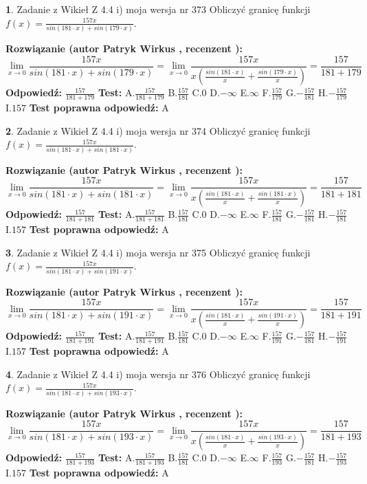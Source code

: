 \documentclass[12pt, a4paper]{article}
\theoremstyle{definition} %
\newtheorem{zad}{}
\newcommand{\zadStart}[1]{\begin{zad}#1\newline}
\newcommand{\zadStop}{\end{zad}}
\newcommand{\rozwStart}[2]{\noindent \textbf{Rozwiązanie (autor #1 , recenzent #2): }\newline}
\newcommand{\rozwStop}{\newline}
\newcommand{\odpStart}{\noindent \textbf{Odpowiedź:}\newline}
\newcommand{\odpStop}{\newline}
\newcommand{\testStart}{\noindent \textbf{Test:}\newline}
\newcommand{\testStop}{\newline}
\newcommand{\kluczStart}{\noindent \textbf{Test poprawna odpowiedź:}\newline}
\newcommand{\kluczStop}{\newline}
\begin{document}
\zadStart{Zadanie z Wikieł Z 4.4 i) moja wersja nr 373}
Obliczyć granicę funkcji $f(x)=\frac{157x}{sin(181\cdot x) +sin(179\cdot x)}$.
\zadStop
\rozwStart{Patryk Wirkus}{}
$$\lim\limits_{x\to 0}\frac{157x}{sin(181\cdot x) +sin(179\cdot x)}=\lim\limits_{x\to 0}\frac{157x}{x(\frac{sin(181\cdot x)}{x}+\frac{sin(179\cdot x)}{x})}=\frac{157}{181+179}$$
\rozwStop
\odpStart
$\frac{157}{181+179}$
\odpStop
\testStart
A.$\frac{157}{181+179}$
B.$\frac{157}{181}$
C.$0$
D.$-\infty$
E.$\infty$
F.$\frac{157}{179}$
G.$-\frac{157}{181}$
H.$-\frac{157}{179}$
I.$157$
\testStop
\kluczStart
A
\kluczStop



\zadStart{Zadanie z Wikieł Z 4.4 i) moja wersja nr 374}
Obliczyć granicę funkcji $f(x)=\frac{157x}{sin(181\cdot x) +sin(181\cdot x)}$.
\zadStop
\rozwStart{Patryk Wirkus}{}
$$\lim\limits_{x\to 0}\frac{157x}{sin(181\cdot x) +sin(181\cdot x)}=\lim\limits_{x\to 0}\frac{157x}{x(\frac{sin(181\cdot x)}{x}+\frac{sin(181\cdot x)}{x})}=\frac{157}{181+181}$$
\rozwStop
\odpStart
$\frac{157}{181+181}$
\odpStop
\testStart
A.$\frac{157}{181+181}$
B.$\frac{157}{181}$
C.$0$
D.$-\infty$
E.$\infty$
F.$\frac{157}{181}$
G.$-\frac{157}{181}$
H.$-\frac{157}{181}$
I.$157$
\testStop
\kluczStart
A
\kluczStop



\zadStart{Zadanie z Wikieł Z 4.4 i) moja wersja nr 375}
Obliczyć granicę funkcji $f(x)=\frac{157x}{sin(181\cdot x) +sin(191\cdot x)}$.
\zadStop
\rozwStart{Patryk Wirkus}{}
$$\lim\limits_{x\to 0}\frac{157x}{sin(181\cdot x) +sin(191\cdot x)}=\lim\limits_{x\to 0}\frac{157x}{x(\frac{sin(181\cdot x)}{x}+\frac{sin(191\cdot x)}{x})}=\frac{157}{181+191}$$
\rozwStop
\odpStart
$\frac{157}{181+191}$
\odpStop
\testStart
A.$\frac{157}{181+191}$
B.$\frac{157}{181}$
C.$0$
D.$-\infty$
E.$\infty$
F.$\frac{157}{191}$
G.$-\frac{157}{181}$
H.$-\frac{157}{191}$
I.$157$
\testStop
\kluczStart
A
\kluczStop



\zadStart{Zadanie z Wikieł Z 4.4 i) moja wersja nr 376}
Obliczyć granicę funkcji $f(x)=\frac{157x}{sin(181\cdot x) +sin(193\cdot x)}$.
\zadStop
\rozwStart{Patryk Wirkus}{}
$$\lim\limits_{x\to 0}\frac{157x}{sin(181\cdot x) +sin(193\cdot x)}=\lim\limits_{x\to 0}\frac{157x}{x(\frac{sin(181\cdot x)}{x}+\frac{sin(193\cdot x)}{x})}=\frac{157}{181+193}$$
\rozwStop
\odpStart
$\frac{157}{181+193}$
\odpStop
\testStart
A.$\frac{157}{181+193}$
B.$\frac{157}{181}$
C.$0$
D.$-\infty$
E.$\infty$
F.$\frac{157}{193}$
G.$-\frac{157}{181}$
H.$-\frac{157}{193}$
I.$157$
\testStop
\kluczStart
A
\kluczStop
\end{document}
